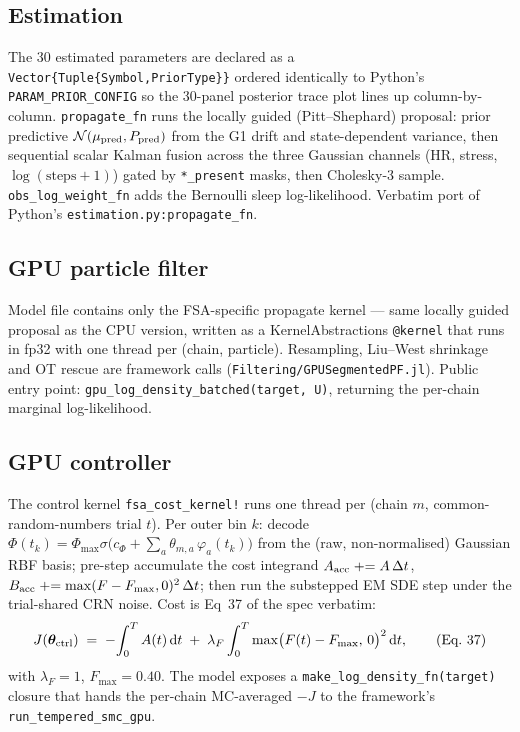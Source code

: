 \documentclass[11pt,a4paper]{article}
\begin{document}
\subsection{Estimation}

The 30 estimated parameters are declared as a
\texttt{Vector\{Tuple\{Symbol,PriorType\}\}} ordered identically to
Python's \texttt{PARAM\_PRIOR\_CONFIG} so the 30-panel posterior trace
plot lines up column-by-column.
\texttt{propagate\_fn} runs the locally guided (Pitt--Shephard)
proposal: prior predictive $\mathcal N(\mu_{\rm pred}, P_{\rm pred})$
from the G1 drift and state-dependent variance, then sequential scalar
Kalman fusion across the three Gaussian channels (HR, stress,
$\log(\mathrm{steps}+1)$) gated by \texttt{*\_present} masks, then
Cholesky-3 sample. \texttt{obs\_log\_weight\_fn} adds the Bernoulli
sleep log-likelihood. Verbatim port of Python's
\texttt{estimation.py:propagate\_fn}.

\subsection{GPU particle filter}

Model file contains only the FSA-specific propagate kernel — same
locally guided proposal as the CPU version, written as a
KernelAbstractions \texttt{@kernel} that runs in fp32 with one thread
per (chain, particle). Resampling, Liu--West shrinkage and OT rescue
are framework calls (\texttt{Filtering/GPUSegmentedPF.jl}). Public
entry point: \texttt{gpu\_log\_density\_batched(target, U)}, returning
the per-chain marginal log-likelihood.

\subsection{GPU controller}

The control kernel \texttt{fsa\_cost\_kernel!} runs one thread per
(chain $m$, common-random-numbers trial $t$). Per outer bin $k$:
decode $\Phi(t_k) = \Phi_{\max}\sigma\big(c_\Phi + \sum_a
\theta_{m,a}\,\varphi_a(t_k)\big)$ from the (raw, non-normalised)
Gaussian RBF basis; pre-step accumulate the cost integrand
$A_{\rm acc}\mathrel{+}= A\,\Delta t$,
$B_{\rm acc}\mathrel{+}= \max(F-F_{\max},0)^2\,\Delta t$;
then run the substepped EM SDE step under the trial-shared CRN noise.
Cost is Eq~37 of the spec verbatim:
\begin{equation}
  J(\bm\theta_{\rm ctrl}) \;=\; -\!\int_0^T A(t)\,\mathrm dt
  \;+\; \lambda_F \int_0^T \max\bigl(F(t) - F_{\max},\,0\bigr)^2\,\mathrm dt,
  \tag{Eq.\ 37}
\end{equation}
with $\lambda_F=1$, $F_{\max}=0.40$. The model exposes a
\texttt{make\_log\_density\_fn(target)} closure that hands the
per-chain MC-averaged $-J$ to the framework's
\texttt{run\_tempered\_smc\_gpu}.
\end{document}
